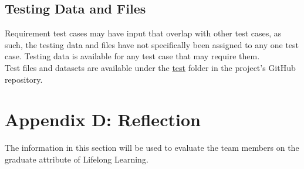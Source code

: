 \documentclass[12pt, titlepage]{article}
\begin{document}
\subsection{Testing Data and Files}
Requirement test cases may have input that overlap with other test cases, as such, the testing data and files have not specifically been
assigned to any one test case. Testing data is available for any test case that may require them. \\
Test files and datasets are available under the \href{https://github.com/emilyperica/ScoreGen/tree/9203b49bd6b54247517192c6b1992f5fa952478f/test}{test} folder
in the project's GitHub repository. \\
\newpage

\renewcommand\refname{Appendix C: References}



\section*{Appendix D: Reflection}

The information in this section will be used to evaluate the team members on the
graduate attribute of Lifelong Learning.


\end{document}
